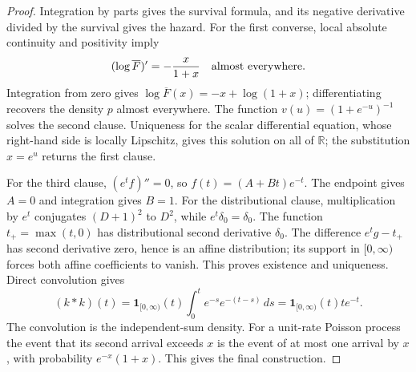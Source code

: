\begin{proof}
Integration by parts gives the survival formula, and its negative
derivative divided by the survival gives the hazard.  For the first
converse, local absolute continuity and positivity imply
\[
 (\log\overline F)'=-\frac{x}{1+x}\quad\hbox{almost everywhere}.
\]
Integration from zero gives
$\log\overline F(x)=-x+\log(1+x)$; differentiating recovers the
density $p$ almost everywhere.  The function
$v(u)=(1+e^{-u})^{-1}$ solves the second clause.  Uniqueness for the
scalar differential equation, whose right-hand side is locally
Lipschitz, gives this solution on all of $\mathbb R$; the substitution
$x=e^u$ returns the first clause.

For the third clause, $(e^tf)''=0$, so
$f(t)=(A+Bt)e^{-t}$.  The endpoint gives $A=0$ and integration
gives $B=1$.  For the distributional clause, multiplication by
$e^t$ conjugates $(D+1)^2$ to $D^2$, while
$e^t\delta_0=\delta_0$.  The function $t_+=\max(t,0)$ has
distributional second derivative $\delta_0$.  The difference
$e^tg-t_+$ has second derivative zero, hence is an affine
distribution; its support in $[0,\infty)$ forces both affine
coefficients to vanish.  This proves existence and uniqueness.
Direct convolution gives
\[
 (k*k)(t)=\mathbf 1_{[0,\infty)}(t)
       \int_0^t e^{-s}e^{-(t-s)}\,ds
       =\mathbf 1_{[0,\infty)}(t)t e^{-t}.
\]
The convolution is the independent-sum density.  For a unit-rate
Poisson process the event that its second arrival exceeds $x$ is
the event of at most one arrival by $x$, with probability
$e^{-x}(1+x)$.  This gives the final construction.
\end{proof}

